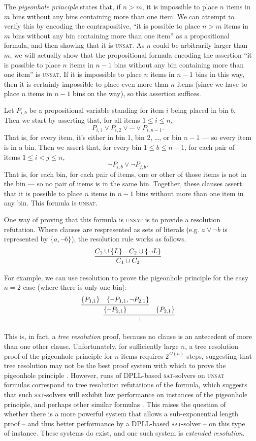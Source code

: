 \documentclass[proof,pdftex,11pt,a4]{article}
\newcommand{\sat}{\textsc{sat}}
\newcommand{\unsat}{\textsc{unsat}}
\begin{document}
The \emph{pigeonhole principle} states that, if $n > m$, it is impossible to place $n$ items in $m$ bins without any bins containing more than one item. We can attempt to verify this by encoding the contrapositive, ``it is possible to place $n>m$ items in $m$ bins without any bin containing more than one item'' as a propositional formula, and then showing that it is \unsat. As $n$ could be arbitrarily larger than $m$, we will actually show that the propositional formula encoding the assertion ``it is possible to place $n$ items in $n-1$ bins without any bin containing more than one item'' is \unsat. If it is impossible to place $n$ items in $n-1$ bins in this way, then it is certainly impossible to place even more than $n$ items (since we have to place $n$ items in $n-1$ bins on the way), so this assertion suffices.

Let $P_{i,b}$ be a propositional variable standing for item $i$ being placed in bin $b$. Then we start by asserting that, for all items $1 \leq i \leq n$,
\[P_{i,1} \vee P_{i,2} \vee \cdots \vee P_{i,n-1}.\]
That is, for every item, it's either in bin 1, bin 2, \dots, or bin $n-1$ --- so every item is in a bin. Then we assert that, for every bin $1 \leq b \leq n-1$, for each pair of items $1 \leq i < j \leq n$,
\[\neg P_{i,b} \vee \neg P_{j,b}.\]
That is, for each bin, for each pair of items, one or other of those items is not in the bin --- so no pair of items is in the same bin. Together, these clauses assert that it is possible to place $n$ items in $n-1$ bins without more than one item in any bin. This formula is \unsat.

One way of proving that this formula is \unsat{} is to provide a resolution refutation. Where clauses are respresented as sets of literals (e.g. $a \vee \neg b$ is represented by $\{a, \neg b\}$), the resolution rule works as follows.\[
\infer{C_1 \cup C_2}{
  C_1 \cup \{L\}
  &
  C_2 \cup \{\neg L\}
}
\]

For example, we can use resolution to prove the pigeonhole principle for the easy $n = 2$ case (where there is only one bin):\[
\infer{\bot}{
  \infer{\{\neg P_{2,1}\}}{
    \{P_{1,1}\}
    &
    \{\neg P_{1,1}, \neg P_{2,1}\}
  }
  &
  \{P_{2,1}\}
}
\]

This is, in fact, a \emph{tree resolution} proof, because no clause is an antecedent of more than one other clause. Unfortunately, for sufficiently large $n$, a tree resolution proof of the pigeonhole principle for $n$ items requires $2^{\Omega(n)}$ steps, suggesting that tree resolution may not be the best proof system with which to prove the pigeonhole principle \cite{Haken:1985}.
However, runs of DPLL-based \sat{}-solvers on \unsat{} formulas correspond to tree resolution refutations of the formula, which suggests that such \sat{}-solvers will exhibit low performance on instances of the pigeonhole principle, and perhaps other similar formulas \cite{Rossi:2006}. This raises the question of whether there is a more powerful system that allows a sub-exponential length proof -- and thus better performance by a DPLL-based \sat{}-solver -- on this type of instance. These systems do exist, and one such system is \emph{extended resolution}.
\end{document}

